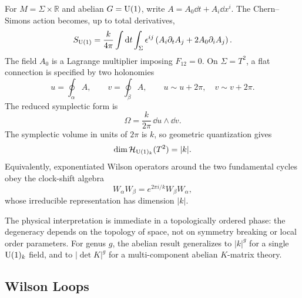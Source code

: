 For $M=\Sigma\times\mathbb R$ and abelian $G=\operatorname{U}(1)$, write $A=A_0\dd t+A_i\dd x^i$. The Chern--Simons action becomes, up to total derivatives,
\begin{equation}
  S_{\operatorname{U}(1)}
  =
  \frac{k}{4\pi}\int\mathrm{d} t\int_\Sigma
  \epsilon^{ij}\left(A_i\partial_tA_j+2A_0\partial_iA_j\right).
  \label{eq:synthesis-canonical-split}
\end{equation}
The field $A_0$ is a Lagrange multiplier imposing $F_{12}=0$. On $\Sigma=T^2$, a flat connection is specified by two holonomies
\begin{equation}
  u=\oint_\alpha A,
  \qquad
  v=\oint_\beta A,
  \qquad
  u\sim u+2\pi,\quad v\sim v+2\pi.
  \label{eq:synthesis-holonomies}
\end{equation}
The reduced symplectic form is
\begin{equation}
  \Omega
  =
  \frac{k}{2\pi}\,\dd u\wedge\dd v.
  \label{eq:synthesis-symplectic-torus}
\end{equation}
The symplectic volume in units of $2\pi$ is $k$, so geometric quantization gives
\begin{equation}
  \dim\mathcal H_{\operatorname{U}(1)_k}(T^2)=|k|.
  \label{eq:synthesis-u1-dim}
\end{equation}
Equivalently, exponentiated Wilson operators around the two fundamental cycles obey the clock-shift algebra
\begin{equation}
  W_\alpha W_\beta
  =
  e^{2\pi i/k}W_\beta W_\alpha,
  \label{eq:synthesis-clock-shift}
\end{equation}
whose irreducible representation has dimension $|k|$.

The physical interpretation is immediate in a topologically ordered phase: the degeneracy depends on the topology of space, not on symmetry breaking or local order parameters. For genus $g$, the abelian result generalizes to $|k|^g$ for a single $\operatorname{U}(1)_k$ field, and to $|\det K|^g$ for a multi-component abelian $K$-matrix theory.

\subsection{Wilson Loops}
\label{subsec:synthesis-wilson-framing}

